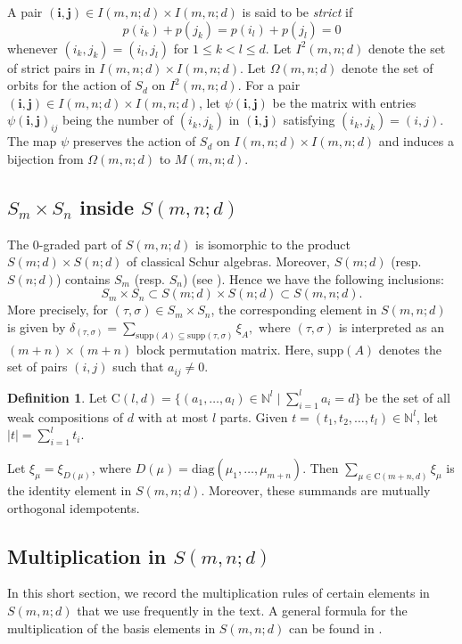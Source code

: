 \documentclass[12pt,reqno]{amsart}
\theoremstyle{definition}
\newtheorem{definition}[theorem]{Definition}
\theoremstyle{remark}
\begin{document}
A pair $(\mathbf{i},\mathbf{j})\in I(m,n;d)\times I(m,n;d)$ is said to be \textit{strict} if $$p(i_{k})+p(j_{k})=p(i_{l})+p(j_{l})=0$$ whenever $(i_{k},j_{k})=(i_{l},j_{l})$ for $1\leq k<l\leq d$. Let $I^{2}(m,n;d)$ denote the set of strict pairs in $I(m,n;d)\times I(m,n;d)$. Let $\Omega(m,n;d)$ denote the set of orbits for the action of $S_d$ on $I^{2}(m,n;d)$. For a pair $(\mathbf{i},\mathbf{j})\in I(m,n;d)\times I(m,n;d)$, let $\psi(\mathbf{i},\mathbf{j})$ be the matrix with entries $\psi(\mathbf{i},\mathbf{j})_{ij}$ being the number of $(i_{k},j_{k})$ in $(\mathbf{i},\mathbf{j})$ satisfying $(i_{k},j_{k})=(i,j)$. The map $\psi$ preserves the action of $S_d$ on $I(m,n;d)\times I(m,n;d)$ and induces a bijection from $\Omega(m,n;d)$ to $M(m,n;d)$.

\subsection{$S_{m}\times S_{n}$ inside $S(m,n;d)$}
The $0$-graded part of $S(m,n;d)$ is isomorphic to the product $S(m;d)\times S(n;d)$ of classical Schur algebras. Moreover, $S(m;d)$ (resp. $S(n;d)$) contains $S_{m}$ (resp. $S_n$) (see \cite[Example 6.2.1]{prasad2015representation}). Hence we have the following inclusions:
$$S_{m}\times S_{n}\subset S(m;d)\times S(n;d)\subset S(m,n;d).$$ More precisely, for $(\tau,\sigma)\in S_m \times S_n$, the corresponding element in $S(m,n;d)$ is given by $\delta_{(\tau,\sigma)}=\sum_{\text{supp}(A)\subseteq \text{supp}(\tau,\sigma)}\xi_{A},$ where $(\tau,\sigma)$ is interpreted as an $(m+n)\times (m+n)$ block permutation matrix.
Here, $\text{supp}(A)$ denotes the set of pairs $(i,j)$ such that $a_{ij}\neq 0$.
\begin{definition}
    Let $\text{C}(l,d)=\{(a_{1},\dotsc,a_{l})\in\mathbb{N}^{l}\mid\sum_{i=1}^{l}a_{i}=d\}$ be the set of all weak compositions of $d$ with at most $l$ parts. Given $t=(t_{1},t_{2},\dotsc,t_{l})\in \mathbb{N}^{l}$, let $|t|=\sum_{i=1}^{l}t_{i}$.
\end{definition} Let $\xi_{\mu}=\xi_{D(\mu)}$, where $D(\mu)=\text{diag}(\mu_{1},\dotsc,\mu_{m+n})$. Then $\sum_{\mu\in \text{C}(m+n,d)}\xi_{\mu}$ is the identity element in $S(m,n;d)$. Moreover, these summands are mutually orthogonal idempotents.

\subsection{Multiplication in $S(m,n;d)$} In this short section, we record the multiplication rules of certain elements in $S(m,n;d)$ that we use frequently in the text. A general formula for the multiplication of the basis elements in $S(m,n;d)$ can be found in \cite[Lemma~5.1]{brundan2003new}. 
\end{document}
